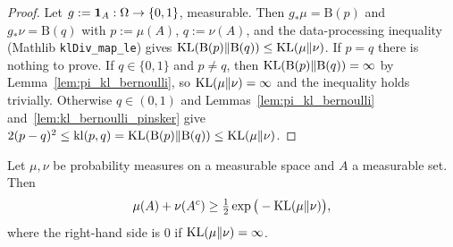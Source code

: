 \begin{proof}
\leanok
{}
Let $g := \mathbf{1}_A : \Omega \to \{0,1\}$, measurable. Then $g_*\mu = \mathrm{B}(p)$ and
$g_*\nu = \mathrm{B}(q)$ with $p := \mu(A)$, $q := \nu(A)$, and the data-processing inequality
(Mathlib \texttt{klDiv\_map\_le}) gives $\mathrm{KL}(\mathrm{B}(p)\|\mathrm{B}(q)) \le \mathrm{KL}(\mu\|\nu)$.
If $p = q$ there is nothing to prove. If $q \in \{0,1\}$ and $p \ne q$, then
$\mathrm{KL}(\mathrm{B}(p)\|\mathrm{B}(q)) = \infty$ by Lemma~\ref{lem:pi_kl_bernoulli}, so
$\mathrm{KL}(\mu\|\nu) = \infty$ and the inequality holds trivially. Otherwise $q \in (0,1)$ and
Lemmas~\ref{lem:pi_kl_bernoulli} and~\ref{lem:kl_bernoulli_pinsker} give
$2(p-q)^2 \le \mathrm{kl}(p,q) = \mathrm{KL}(\mathrm{B}(p)\|\mathrm{B}(q)) \le \mathrm{KL}(\mu\|\nu)$.
\end{proof}

\begin{lemma}\label{lem:bretagnolle_huber}
\leanok
Let $\mu, \nu$ be probability measures on a measurable space and $A$ a measurable set. Then
\[
  \mu(A) + \nu(A^c) \ge \tfrac12 \exp\big(-\mathrm{KL}(\mu\|\nu)\big),
\]
where the right-hand side is $0$ if $\mathrm{KL}(\mu\|\nu) = \infty$.
\end{lemma}

